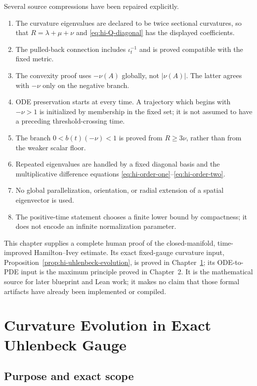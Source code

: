 \documentclass[10pt]{coll-l}
\theoremstyle{definition}
\theoremstyle{remark}
\numberwithin{section}{chapter}
\numberwithin{equation}{chapter}
\begin{document}
Several source compressions have been repaired explicitly.
\begin{enumerate}
\item The curvature eigenvalues are declared to be twice sectional
      curvatures, so that $R=\lambda+\mu+\nu$ and
      \eqref{eq:hi-Q-diagonal} has the displayed coefficients.
\item The pulled-back connection includes $\iota_t^{-1}$ and is proved
      compatible with the fixed metric.
\item The convexity proof uses $-\nu(A)$ globally, not
      $|\nu(A)|$.  The latter agrees with $-\nu$ only on the negative
      branch.
\item ODE preservation starts at every time.  A trajectory which begins
      with $-\nu>1$ is initialized by membership in the fixed set; it is
      not assumed to have a preceding threshold-crossing time.
\item The branch $0<b(t)(-\nu)<1$ is proved from
      $R\geq3\nu$, rather than from the weaker scalar floor.
\item Repeated eigenvalues are handled by a fixed diagonal basis and the
      multiplicative difference equations
      \eqref{eq:hi-order-one}--\eqref{eq:hi-order-two}.
\item No global parallelization, orientation, or radial extension of a
      spatial eigenvector is used.
\item The positive-time statement chooses a finite lower bound by
      compactness; it does not encode an infinite normalization parameter.
\end{enumerate}

This chapter supplies a complete human proof of the closed-manifold,
time-improved Hamilton--Ivey estimate.  Its exact fixed-gauge curvature
input, Proposition~\ref{prop:hi-uhlenbeck-evolution}, is proved in
Chapter~\ref{ch:curvature-evolution}; its ODE-to-PDE input is the maximum
principle proved in Chapter~2.  It is the mathematical source for later
blueprint and Lean work; it makes no claim that those formal artifacts have
already been implemented or compiled.

\chapter{Curvature Evolution in Exact Uhlenbeck Gauge}
\label{ch:curvature-evolution}

\section{Purpose and exact scope}
\label{sec:ue-purpose}
\end{document}
